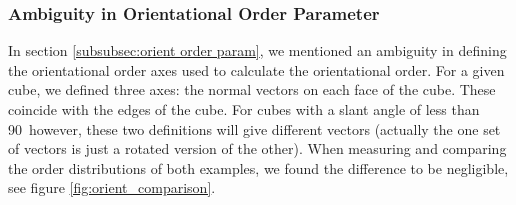 \documentclass[thesis]{subfiles}
\begin{document}




\subsubsection{Ambiguity in Orientational Order Parameter}\label{subsec:orientation vectors}

In section \ref{subsubsec:orient order param}, we mentioned an ambiguity in defining the orientational order axes used to calculate the orientational order. For a given cube, we defined three axes: the normal vectors on each face of the cube. These coincide with the edges of the cube. For cubes with a slant angle of less than 90\degr\ however, these two definitions will give different vectors (actually the one set of vectors is just a rotated version of the other). When measuring and comparing the order distributions of both examples, we found the difference to be negligible, see figure \ref{fig:orient_comparison}.
\end{document}
